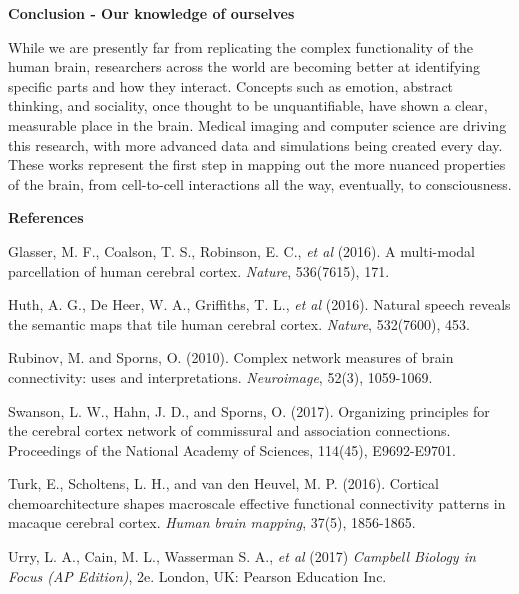 \noindent
\textbf{Conclusion - Our knowledge of ourselves}

While we are presently far from replicating the complex functionality of the human brain, researchers across the world are becoming better at identifying specific parts and how they interact. Concepts such as emotion, abstract thinking, and sociality, once thought to be unquantifiable, have shown a clear, measurable place in the brain. Medical imaging and computer science are driving this research, with more advanced data and simulations being created every day. These works represent the first step in mapping out the more nuanced properties of the brain, from cell-to-cell interactions all the way, eventually, to consciousness.

\noindent
\textbf{References}
\begingroup
\renewcommand{\section}[2]{}%
\begin{thebibliography}{6}
Glasser, M. F., Coalson, T. S., Robinson, E. C., \textit{et al} (2016). 
A multi-modal parcellation of human cerebral cortex. 
\textit{Nature}, 536(7615), 171.

Huth, A. G., De Heer, W. A., Griffiths, T. L., \textit{et al} (2016). 
Natural speech reveals the semantic maps that tile human cerebral cortex. 
\textit{Nature}, 532(7600), 453.

Rubinov, M. and Sporns, O. (2010). 
Complex network measures of brain connectivity: uses and interpretations. 
\textit{Neuroimage}, 52(3), 1059-1069.

Swanson, L. W., Hahn, J. D., and Sporns, O. (2017). 
Organizing principles for the cerebral cortex network of commissural and association connections. 
Proceedings of the National Academy of Sciences, 114(45), E9692-E9701.

Turk, E., Scholtens, L. H., and van den Heuvel, M. P. (2016). 
Cortical chemoarchitecture shapes macroscale effective functional connectivity patterns in macaque cerebral cortex. 
\textit{Human brain mapping}, 37(5), 1856-1865.

Urry, L. A., Cain, M. L., Wasserman S. A., \textit{et al} (2017) 
\textit{Campbell Biology in Focus (AP Edition)}, 2e. London, UK: Pearson Education Inc.

\end{thebibliography}
\endgroup